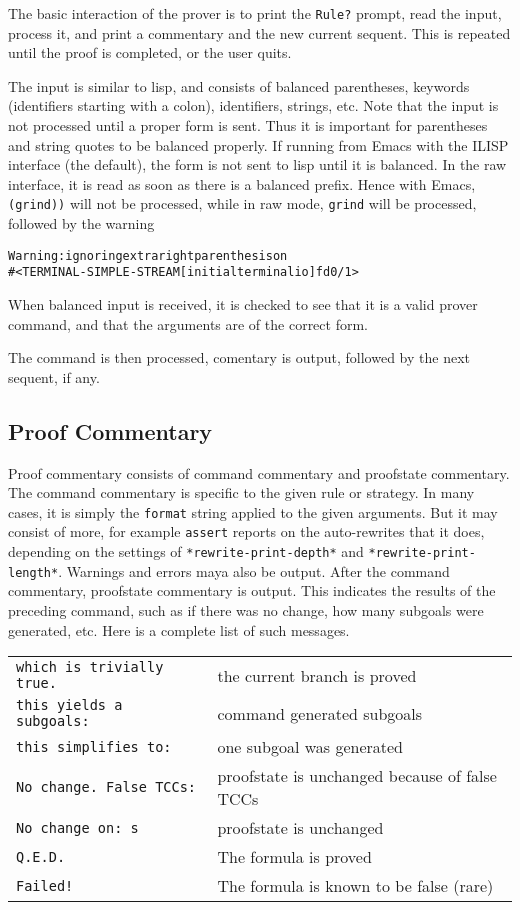 \documentclass[12pt]{book}
\def\tilde{\symbol{'176}}
\newcommand{\globalnm}[1]{\texttt{\textup{#1}}}
\begin{document}
The basic interaction of the prover is to print the \texttt{Rule?}
prompt, read the input, process it, and print a commentary and the new
current sequent.  This is repeated until the proof is completed, or the
user quits.

The input is similar to lisp, and consists of balanced parentheses,
keywords (identifiers starting with a colon), identifiers, strings, etc.
Note that the input is not processed until a proper form is sent.  Thus it
is important for parentheses and string quotes to be balanced properly.
If running from Emacs with the ILISP interface (the default), the form is
not sent to lisp until it is balanced.  In the raw interface, it is read
as soon as there is a balanced prefix.  Hence with Emacs,
\texttt{(grind))} will not be processed, while in raw mode, \texttt{grind}
will be processed, followed by the warning
\begin{alltt}
Warning: ignoring extra right parenthesis on
         #<TERMINAL-SIMPLE-STREAM [initial terminal io] fd 0/1>
\end{alltt}
When balanced input is received, it is checked to see that it is a valid
prover command, and that the arguments are of the correct form.

The command is then processed, comentary is output, followed by the next
sequent, if any.

\subsection{Proof Commentary}

Proof commentary consists of command commentary and proofstate
commentary.  The command commentary is specific to the given rule or
strategy.  In many cases, it is simply the \texttt{format} string applied
to the given arguments.  But it may consist of more, for example
\texttt{assert} reports on the auto-rewrites that it does, depending on
the settings of \globalnm{*rewrite-print-depth*} and
\globalnm{*rewrite-print-length*}.  Warnings and errors maya also be
output.  After the command commentary, proofstate commentary is output.
This indicates the results of the preceding command, such as if there was
no change, how many subgoals were generated, etc.  Here is a complete list
of such messages.

\noindent\begin{tabular}{|>{\tt}l|l|}\hline
which is trivially true. & the current branch is proved \\
this yields \tilde a subgoals: & command generated subgoals \\
this simplifies to:  & one subgoal was generated \\
No change. False TCCs: & proofstate is unchanged because of false TCCs \\
No change on: \tilde s & proofstate is unchanged \\
Q.E.D. & The formula is proved \\
Failed! & The formula is known to be false (rare) \\
\hline
\end{tabular}
\end{document}
